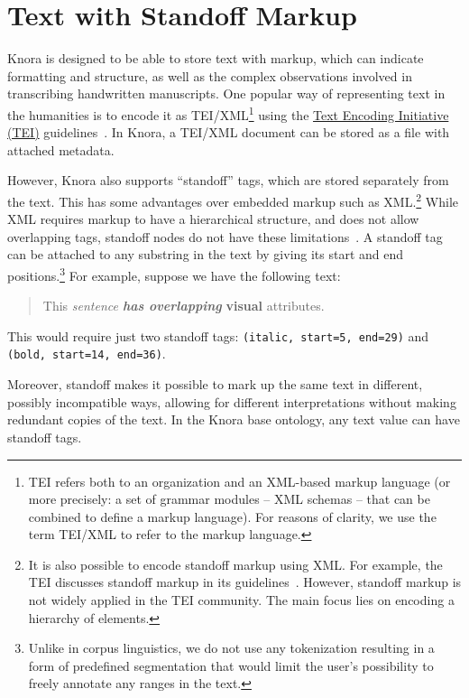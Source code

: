 \documentclass[12pt, a4paper]{article}
\begin{document}
\section{Text with Standoff Markup}

\label{sec:standoff}

Knora is designed to be able to store text with markup, which can indicate formatting and structure, as well as the complex observations involved in transcribing handwritten manuscripts. One popular way of representing text in the humanities is to encode it as TEI/XML\footnote{TEI refers both to an organization and an XML-based markup language (or more precisely: a set of grammar modules -- XML schemas -- that can be combined to define a markup language). For reasons of clarity, we use the term TEI/XML to refer to the markup language.} using the \href{http://www.tei-c.org/index.xml}{Text Encoding Initiative (TEI)} guidelines~\cite{P5}. In Knora, a TEI/XML document can be stored as a file with attached metadata.

However, Knora also supports \enquote{standoff} tags, which are stored separately from the text. This has some advantages over embedded markup such as XML.\footnote{It is also possible to encode standoff markup using XML. For example, the TEI discusses standoff markup in its guidelines~\cite[chapters 16.9 and 20.4]{P5}. However, standoff markup is not widely applied in the TEI community. The main focus lies on encoding a hierarchy of elements.} While XML requires markup to have a hierarchical structure, and does not allow overlapping tags, standoff nodes do not have these limitations~\cite{Schmidt_Standoff}. A standoff tag can be attached to any substring in the text by giving its start and end positions.\footnote{Unlike in corpus linguistics, we do not use any tokenization resulting in a form of predefined segmentation that would limit the user's possibility to freely annotate any ranges in the text.} For example, suppose we have the following text:

\begin{quote}
This \textit{sentence \textbf{has overlapping}}\textbf{ visual} attributes.
\end{quote}

This would require just two standoff tags: \texttt{(italic, start=5, end=29)} and \texttt{(bold, start=14, end=36)}.

Moreover, standoff makes it possible to mark up the same text in different, possibly incompatible ways, allowing for different interpretations without making redundant copies of the text. In the Knora base ontology, any text value can have standoff tags.
\end{document}
